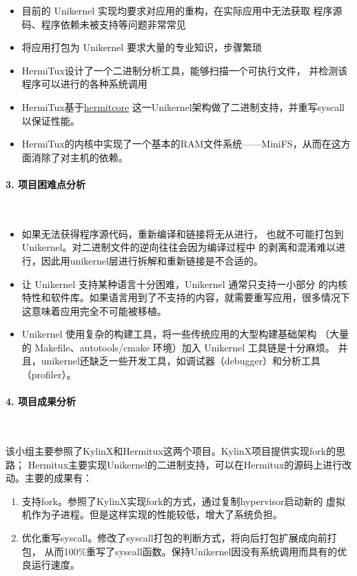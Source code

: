 \documentclass[UTF8,fontset=none,linespread=1.15]{ctexart}
\begin{document}
\begin{itemize}
\item 目前的 Unikernel 实现均要求对应用的重构，在实际应用中无法获取
程序源码、程序依赖未被支持等问题非常常见
\item 将应用打包为 Unikernel 要求大量的专业知识，步骤繁琐
\item HermiTux设计了一个二进制分析工具，能够扫描一个可执行文件，
并检测该程序可以进行的各种系统调用
\item HermiTux基于\href{https://github.com/hermitcore/rusty-hermit}{hermitcore}
这一Unikernel架构做了二进制支持，并重写syscall以保证性能。
\item HermiTux的内核中实现了一个基本的RAM文件系统——MiniFS，从而在这方面消除了对主机的依赖。
\end{itemize}

\paragraph{3. 项目困难点分析}~\par

\begin{itemize}
\item 如果无法获得程序源代码，重新编译和链接将无从进行，
也就不可能打包到 Unikernel。对二进制文件的逆向往往会因为编译过程中
的剥离和混淆难以进行，因此用unikernel层进行拆解和重新链接是不合适的。
\item 让 Unikernel 支持某种语言十分困难，Unikernel 通常只支持一小部分
的内核特性和软件库。如果语言用到了不支持的内容，就需要重写应用，很多情况下
这意味着应用完全不可能被移植。
\item Unikernel 使用复杂的构建工具，将一些传统应用的大型构建基础架构
（大量的 Makefile、autotools/cmake 环境）加入 Unikernel 工具链是十分麻烦。
并且，unikernel还缺乏一些开发工具，如调试器（debugger）和分析工具（profiler）。
\end{itemize}

\paragraph{4. 项目成果分析}~\par

​该小组主要参照了KylinX和Hermitux这两个项目。KylinX项目提供实现fork的思路；
Hermitux主要实现Unikernel的二进制支持，可以在Hermitux的源码上进行改动。主要的成果有：
\begin{enumerate}
\item 支持fork。参照了KylinX实现fork的方式，通过复制hypervisor启动新的
虚拟机作为子进程。但是这样实现的性能较低，增大了系统负担。
\item 优化重写syscall。修改了syscall打包的判断方式，将向后打包扩展成向前打包，
从而100\%重写了syscall函数。保持Unikernel因没有系统调用而具有的优良运行速度。
\end{enumerate}
\end{document}
